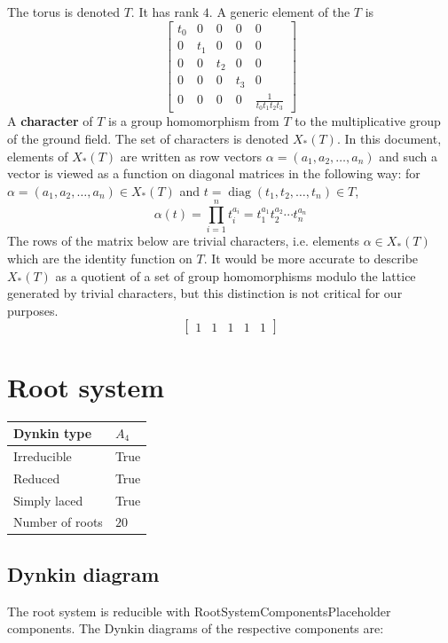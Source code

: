 \documentclass[11pt]{article}
\newcommand{\tbf}{\textbf}
\DeclareMathOperator{\diag}{diag}
\theoremstyle{definition}
\newif\ifrootsystemirreducible
\begin{document}
The torus is denoted $T$. It has rank $4$. A generic element of the $T$ is
\[
\left[\begin{matrix}t_{0} & 0 & 0 & 0 & 0\\0 & t_{1} & 0 & 0 & 0\\0 & 0 & t_{2} & 0 & 0\\0 & 0 & 0 & t_{3} & 0\\0 & 0 & 0 & 0 & \frac{1}{t_{0} t_{1} t_{2} t_{3}}\end{matrix}\right]
\]
A \tbf{character} of $T$ is a group homomorphism from $T$ to the multiplicative group of the ground field. The set of characters is denoted $X_*(T)$. In this document, elements of $X_*(T)$ are written as row vectors $\alpha = (a_1, a_2, \ldots, a_n)$ and such a vector is viewed as a function on diagonal matrices in the following way: for $\alpha = (a_1, a_2, \ldots, a_n) \in X_*(T)$ and $t = \diag(t_1, t_2, \ldots, t_n) \in T$, 
\[
	\alpha(t) = \prod_{i=1}^n t_i^{a_i} = t_1^{a_1} t_2^{a_2} \cdots t_n^{a_n}
\]
The rows of the matrix below are trivial characters, i.e. elements $\alpha \in X_*(T)$ which are the identity function on $T$. It would be more accurate to describe $X_*(T)$ as a quotient of a set of group homomorphisms modulo the lattice generated by trivial characters, but this distinction is not critical for our purposes.
\[
\left[\begin{matrix}1 & 1 & 1 & 1 & 1\end{matrix}\right]
\]

\newpage
\section{Root system}

\begin{tabular}{|l|l|}
	\hline
    Dynkin type & $A_4$ \\
	\hline
    Irreducible & True \\
	\hline
    Reduced & True \\
	\hline
	Simply laced & True \\
	\hline
	Number of roots & $20$ \\
	\hline
\end{tabular}

\subsection{Dynkin diagram}

\ifrootsystemirreducible
The root system is irreducible and has Dynkin diagram:
\else
The root system is reducible with RootSystemComponentsPlaceholder components. The Dynkin diagrams of the respective components are:
\fi
\end{document}
